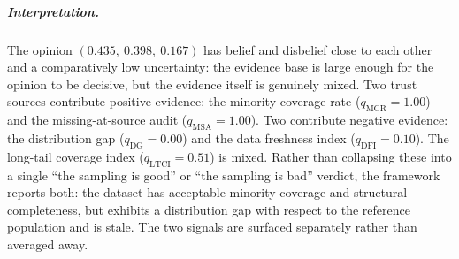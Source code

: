 \subparagraph{Interpretation.}
The opinion $(0.435,\ 0.398,\ 0.167)$ has belief and disbelief close to each other and a comparatively low uncertainty: the evidence base is large enough for the opinion to be decisive, but the evidence itself is genuinely mixed. Two trust sources contribute positive evidence: the minority coverage rate ($q_{\text{MCR}} = 1.00$) and the missing-at-source audit ($q_{\text{MSA}} = 1.00$). Two contribute negative evidence: the distribution gap ($q_{\text{DG}} = 0.00$) and the data freshness index ($q_{\text{DFI}} = 0.10$). The long-tail coverage index ($q_{\text{LTCI}} = 0.51$) is mixed. Rather than collapsing these into a single ``the sampling is good'' or ``the sampling is bad'' verdict, the framework reports both: the dataset has acceptable minority coverage and structural completeness, but exhibits a distribution gap with respect to the reference population and is stale. The two signals are surfaced separately rather than averaged away.


